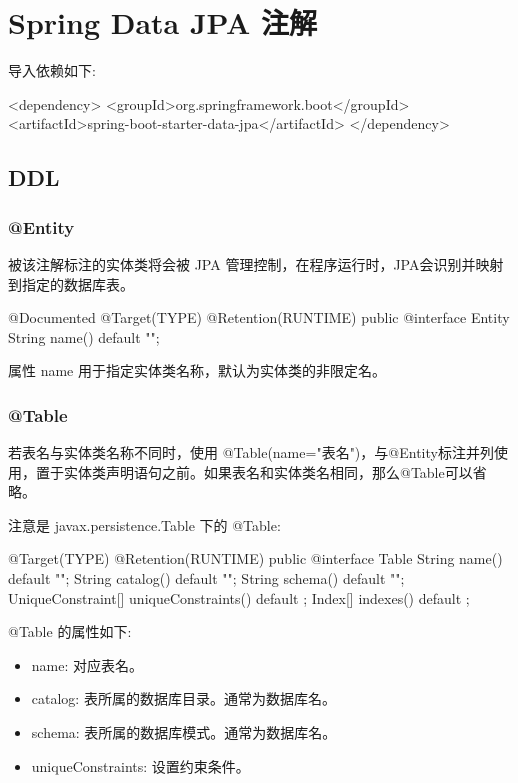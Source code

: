 \section{Spring Data JPA 注解}

导入依赖如下:

\begin{Java}
<dependency>
    <groupId>org.springframework.boot</groupId>
    <artifactId>spring-boot-starter-data-jpa</artifactId>
</dependency>
\end{Java}

\subsection{DDL}

\subsubsection{@Entity}

被该注解标注的实体类将会被 JPA 管理控制，在程序运行时，JPA会识别并映射到指定的数据库表。

\begin{Java}
@Documented
@Target(TYPE)
@Retention(RUNTIME)
public @interface Entity {
	String name() default "";
}
\end{Java}

属性 name 用于指定实体类名称，默认为实体类的非限定名。

\subsubsection{@Table}

若表名与实体类名称不同时，使用 @Table(name="表名")，与@Entity标注并列使用，置于实体类声明语句之前。如果表名和实体类名相同，那么@Table可以省略。

注意是 javax.persistence.Table 下的 @Table:

\begin{Java}
@Target(TYPE) 
@Retention(RUNTIME)
public @interface Table {
    String name() default "";
    String catalog() default "";
    String schema() default "";
    UniqueConstraint[] uniqueConstraints() default {};
    Index[] indexes() default {};
}
\end{Java}

@Table 的属性如下:
\begin{itemize}
    \item name: 对应表名。
    \item catalog: 表所属的数据库目录。通常为数据库名。
    \item schema: 表所属的数据库模式。通常为数据库名。
    \item uniqueConstraints: 设置约束条件。
\end{itemize}

